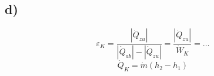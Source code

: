 

\subsection*{d)}
\[
\varepsilon_K = \frac{|\dot{Q}_{zu}|}{|\dot{Q}_{ab}| - |\dot{Q}_{zu}|} = \frac{|\dot{Q}_{zu}|}{\dot{W}_K} = \ldots
\]
\[
\dot{Q}_K = \dot{m}(h_2 - h_1)
\]